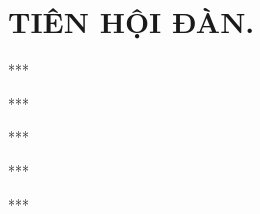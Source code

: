 \chapter{\uppercase{Tiên hội đàn.}}



\begin{center}
  ***
\end{center}



\begin{center}
  ***
\end{center}



\begin{center}
  ***
\end{center}



\begin{center}
  ***
\end{center}



\begin{center}
  ***
\end{center}
